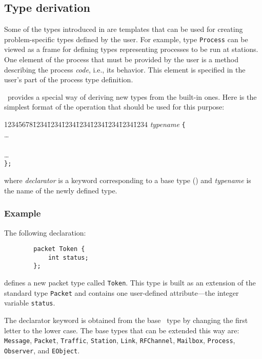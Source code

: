 \subsection {Type derivation}
\label{rm_st_td}

Some of the types introduced in 
are templates that
can be used for creating problem-specific types defined by the user.
For example, type {\tt Process} can be viewed as a frame for defining
types representing processes to be run at stations.
One element of the process that must be provided by the user is a method
describing the process {\em code}, i.e., its behavior.
This element is specified in the user's part of the process type
definition.

\smurph\ provides a special way of deriving new types from the built-in
ones.
Here is the
simplest format of the operation that should be used for this purpose:
{\tt\begin{tabbing}
12345678\=1234\=1234\=1234\=1234\=1234\=1234\=1234\=1234\kill
{} {\em typename\/} {\tt \{} \\
\> \>\ldots \\
\>  \\
\> \>\ldots \\
\> {\tt \};}
\end{tabbing}}
\noindent
where {\em declarator\/} is a keyword corresponding to a base {\smurph}
type () and {\em typename\/} is the name of the
newly defined type.

\subsubsection*{Example}

\noindent
The following declaration:
\begin{verbatim}
        packet Token {
            int status;
        };
\end{verbatim}
defines a new packet type called {\tt Token}.
This type is built as an extension of the standard type {\tt Packet} and
contains one user-defined attribute---the integer variable {\tt status}.

The declarator keyword is obtained from the base \smurph\ type by changing
the first letter to the lower case.
The base types that can be extended this way are: {\tt Message},
{\tt Packet}, {\tt Traffic}, {\tt Station}, {\tt Link}, {\tt RFChannel},
{\tt Mailbox},
{\tt Process}, {\tt Observer}, and {\tt EObject}.

